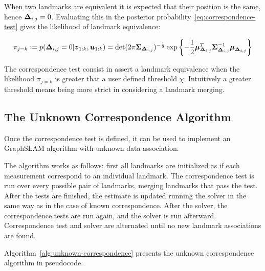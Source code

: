 
When two landmarks are equivalent it is expected that their position is the same, hence $\boldsymbol{\Delta}_{i,j}=0$. Evaluating this in the posterior probability~\eqref{eq:correspondence-test} gives the likelihood of landmark equivalence:

\begin{equation}
\pi_{j=k} \vcentcolon=
p(\boldsymbol{\Delta}_{i,j}=0|\boldsymbol{z}_{1:k},\boldsymbol{u}_{1:k})=
\det(2\pi\boldsymbol{\Sigma}_{\boldsymbol{\Delta}_{i,j}})^{-\frac{1}{2}}
\exp\left\lbrace-\frac{1}{2}\boldsymbol{\mu}_{\boldsymbol{\Delta}_{i,j}}^T\boldsymbol{\Sigma}_{\boldsymbol{\Delta}_{i,j}}^{-1}\boldsymbol{\mu}_{\boldsymbol{\Delta}_{i,j}}\right\rbrace
\label{eq:landmark-equivalence}
\end{equation}

The correspondence test consist in assert a landmark equivalence when the likelihood $\pi_{j=k}$ is greater that a user defined threshold $\chi$. Intuitively a greater threshold means being more strict in considering a landmark merging.

\subsection{The Unknown Correspondence Algorithm}

Once the correspondence test is defined, it can be used to implement an GraphSLAM algorithm with unknown data association. 

The algorithm works as follows: first all landmarks are initialized as if each measurement correspond to an individual landmark. The correspondence test is run over every possible pair of landmarks, merging landmarks that pass the test. After the tests are finished, the estimate is updated running the solver in the same way as in the case of known correspondence. After the solver, the correspondence tests are run again, and the solver is run afterward. Correspondence test and solver are alternated until no new landmark associations are found. 

Algorithm~\ref{alg:unknown-correspondence} presents the unknown correspondence algorithm in pseudocode. 

